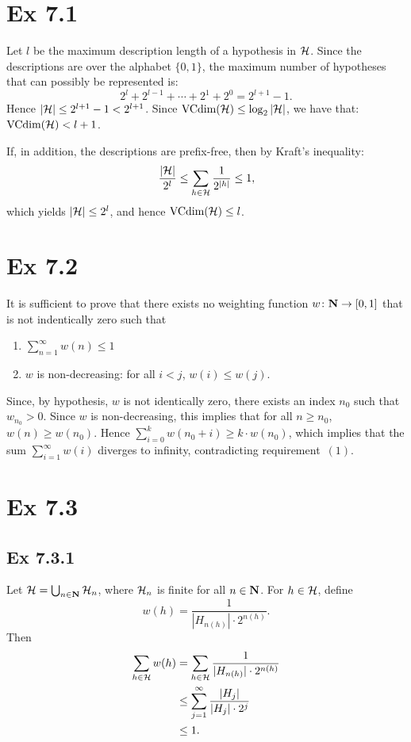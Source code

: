 \section*{Ex 7.1}

Let $l$ be the maximum description length of a hypothesis in $\mathcal{H}$. Since
the descriptions are over the alphabet $\{0, 1\}$, the maximum number of hypotheses
that can possibly be represented is:
\[
    2^{l} + 2^{l - 1} + \cdots + 2^1 + 2^0 = 2^{l + 1} - 1.
\]
Hence $|\mathcal{H}| \leq 2^{l + 1} - 1 < 2^{l + 1}$. Since
$\text{VCdim} (\mathcal{H}) \leq \log_2 |\mathcal{H}|$, we have that:
$\text{VCdim} (\mathcal{H}) < l + 1$.

If, in addition, the descriptions are prefix-free, then by Kraft's
inequality:
\[
    \frac{|\mathcal{H}|}{2^l} \leq \sum_{h \in \mathcal{H}} \frac{1}{2^{|h|}} \leq 1,
\]
which yields $|\mathcal{H}| \leq 2^l$, and hence $\text{VCdim} (\mathcal{H}) \leq l$.

\section*{Ex 7.2}

It is sufficient to prove that there exists no weighting function
$w \colon \mathbf{N} \rightarrow [0, 1]$ that is not indentically zero such that
\begin{enumerate}
    \item $\sum_{n = 1}^{\infty} w(n) \leq 1$
    \item $w$ is non-decreasing: for all $i < j$, $w(i) \leq w(j)$.
\end{enumerate}
Since, by hypothesis, $w$ is not identically zero, there exists an index $n_0$
such that $w_{n_0} > 0$. Since $w$ is non-decreasing, this implies that for
all $n \geq n_0$, $w(n) \geq w(n_0)$. Hence
$\sum_{i = 0}^{k} w( n_0 + i ) \geq k \cdot w( n_0 )$, which implies that
the sum $\sum_{i = 1}^{\infty} w(i)$ diverges to infinity, contradicting
requirement~$(1)$.

\section*{Ex 7.3}

\subsection*{Ex 7.3.1}

Let $\mathcal{H} = \bigcup_{n \in \mathbf{N}} \mathcal{H}_n$, where $\mathcal{H}_n$ is finite
for all $n \in \mathbf{N}$. For $h \in \mathcal{H}$, define
\[
    w(h) = \frac{1}{|H_{ n(h) }| \cdot 2^{ n(h) }}.
\]
Then
\begin{align*}
\sum_{h \in \mathcal{H}} w(h) & = \sum_{h \in \mathcal{H}} \frac{1}{|H_{ n(h) }| \cdot 2^{ n(h) }} \\
    & \leq \sum_{j = 1}^{\infty} \frac{|H_j|}{|H_j| \cdot 2^j} \\
    & \leq 1.
\end{align*}


